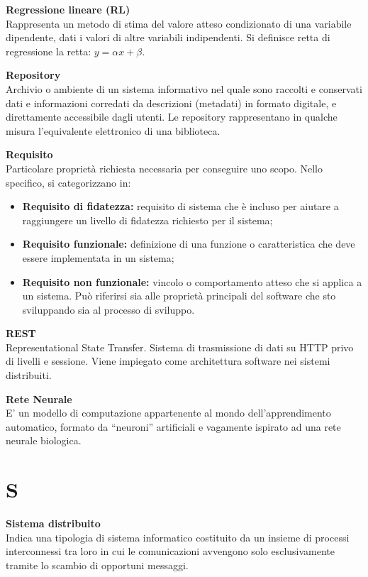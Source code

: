 \documentclass[a4paper, oneside, openany, dvipsnames, table, 12pt]{article}
\begin{document}
\textbf{Regressione lineare (RL)} \\
Rappresenta un metodo di stima del valore atteso condizionato di una variabile dipendente, dati i valori di altre variabili indipendenti. Si definisce retta di regressione la retta: $y = \alpha x + \beta $.

\textbf{Repository} \\
Archivio o ambiente di un sistema informativo nel quale sono raccolti e conservati dati e informazioni corredati da descrizioni (metadati) in formato digitale, e direttamente accessibile dagli utenti. Le repository
rappresentano in qualche misura l’equivalente elettronico di una biblioteca.

\textbf{Requisito}\\	Particolare proprietà richiesta necessaria per conseguire uno scopo. Nello specifico, si categorizzano in:
\begin{itemize}
	\item \textbf{Requisito di fidatezza:} requisito di sistema che è incluso per aiutare a raggiungere un livello di fidatezza richiesto per il sistema;
	\item \textbf{Requisito funzionale:} definizione di una funzione o caratteristica che deve essere implementata in un sistema;
	\item \textbf{Requisito non funzionale:} vincolo o comportamento atteso che si applica a un sistema. Può riferirsi sia alle proprietà principali del software che sto sviluppando sia al processo di sviluppo.
\end{itemize}

\textbf{REST} \\
Representational State Transfer. Sistema di trasmissione di dati su HTTP privo di livelli e sessione. Viene impiegato come architettura software nei sistemi distribuiti.

\textbf{Rete Neurale} \\
E’ un modello di computazione appartenente al mondo dell’apprendimento automatico, formato da “neuroni” artificiali e vagamente ispirato ad una rete neurale biologica.


\newpage
\section{S}
\textbf{Sistema distribuito} \\
Indica una tipologia di sistema informatico costituito da un insieme di processi interconnessi tra loro in cui le comunicazioni avvengono solo esclusivamente tramite lo scambio di opportuni messaggi.
\end{document}
